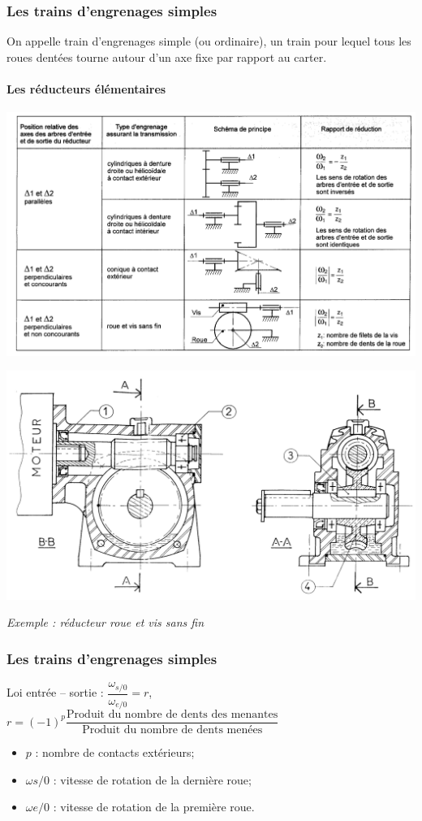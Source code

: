 \documentclass[11pt,oneside]{article}
\begin{document}
\subsubsection{Les trains d'engrenages simples}

On appelle train d’engrenages simple (ou ordinaire), un train pour lequel tous les roues dentées tourne autour d’un axe fixe par rapport au carter.

\paragraph{Les réducteurs élémentaires}
\begin{center}
\includegraphics[width=.8\textwidth]{png/fig_80}
\end{center}
\begin{center}
\includegraphics[width=.8\textwidth]{png/fig_81}

\textit{Exemple : réducteur roue et vis sans fin}
\end{center}

\subsubsection{Les trains d'engrenages simples}
Loi entrée -- sortie : $\dfrac{\omega_{s/0}}{\omega_{e/0}}=r$, $r=(-1)^p \dfrac{\text{Produit du nombre de dents des menantes}}{\text{Produit du nombre de dents menées}}$
\begin{itemize}
\item $p$ : nombre de contacts extérieurs;
\item $\omega{s/0}$ : vitesse de rotation de la dernière roue;
\item $\omega{e/0}$ : vitesse de rotation de la première roue.
\end{itemize}
\end{document}
